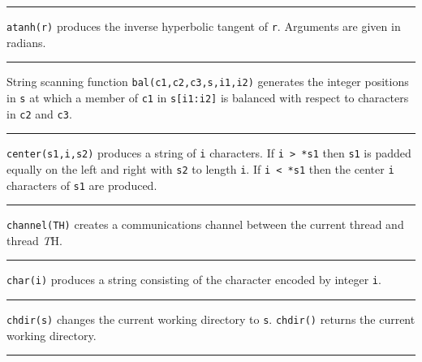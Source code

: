 \bigskip\hrule\vspace{0.1cm}

\noindent
{}\texttt{atanh(r)} produces the inverse
hyperbolic tangent of \texttt{r}. Arguments are given in radians.

\bigskip\hrule\vspace{0.1cm}

\noindent
{}String scanning function
\texttt{bal(c1,c2,c3,s,i1,i2)} generates the integer positions in
\texttt{s} at which a member of \texttt{c1} in \texttt{s[i1:i2]} is
balanced with respect to characters in \texttt{c2} and \texttt{c3}.

\bigskip\hrule\vspace{0.1cm}

\noindent
{}\texttt{center(s1,i,s2)} produces a
string of \texttt{i} characters. If \texttt{i {\textgreater} *s1} then
\texttt{s1} is padded equally on the left and right with \texttt{s2} to
length \texttt{i}. If \texttt{i {\textless} *s1} then the center
\texttt{i} characters of \texttt{s1} are produced.

\bigskip\hrule\vspace{0.1cm}

\noindent
{}\texttt{channel(TH)} creates a communications channel
between the current thread and thread {\textit TH}.

\bigskip\hrule\vspace{0.1cm}

\noindent
{}\texttt{char(i)} produces a string consisting of the
character encoded by integer \texttt{i}.

\bigskip\hrule\vspace{0.1cm}

\noindent
{}\texttt{chdir(s)} changes the current
working directory to \texttt{s}. \texttt{chdir()} returns the current
working directory.

\bigskip\hrule\vspace{0.1cm}

